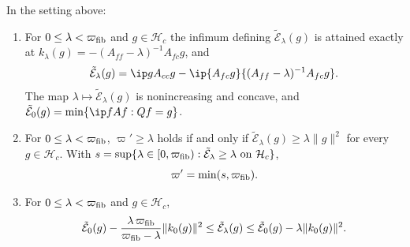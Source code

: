\begin{theorem}\label{rR6:feshbach}
In the setting above:
\begin{enumerate}[label=\textup{(\roman*)},leftmargin=*]
\item For $0\le\lambda<\varpi_{\rm fib}$ and $g\in\mathcal H_c$ the infimum
defining $\tilde{\mathcal E}_\lambda(g)$ is attained exactly at
$k_\lambda(g)=-(A_{ff}-\lambda)^{-1}A_{fc}g$, and
\[
\tilde{\mathcal E}_\lambda(g)=\ip g{A_{cc}g}-\ip{A_{fc}g}{(A_{ff}-
\lambda)^{-1}A_{fc}g}.
\]
The map $\lambda\mapsto\tilde{\mathcal E}_\lambda(g)$ is nonincreasing and
concave, and $\tilde{\mathcal E}_0(g)=\min\{\ip fAf:Qf=g\}$.
\item For $0\le\lambda<\varpi_{\rm fib}$, $\varpi'\ge\lambda$ holds if and
only if $\tilde{\mathcal E}_\lambda(g)\ge\lambda\lVert g\rVert^2$ for every
$g\in\mathcal H_c$. With $s=\sup\{\lambda\in[0,\varpi_{\rm fib}):
\tilde{\mathcal E}_\lambda\ge\lambda\text{ on }\mathcal H_c\}$,
\[
\varpi'=\min(s,\varpi_{\rm fib}).
\]
\item For $0\le\lambda<\varpi_{\rm fib}$ and $g\in\mathcal H_c$,
\[
\tilde{\mathcal E}_0(g)-\frac{\lambda\,\varpi_{\rm fib}}{\varpi_{\rm fib}-
\lambda}\lVert k_0(g)\rVert^2\le\tilde{\mathcal E}_\lambda(g)\le\tilde
{\mathcal E}_0(g)-\lambda\lVert k_0(g)\rVert^2 .
\]
\end{enumerate}
\end{theorem}

